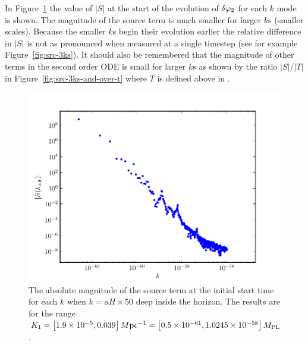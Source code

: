 In Figure~\ref{fig:src-kinit} the value of $|S|$ at the start of the evolution of $\delta\varphi_{2}$ for
each $k$ mode is shown. The magnitude of the source term is much smaller for larger $k$s (smaller
scales). 
Because the smaller $k$s begin their evolution earlier the relative difference in $|S|$ is not as
pronounced when measured at a single timestep (see for example Figure~\ref{fig:src-3ks}).
It should also be remembered that the magnitude of other terms in the second order ODE is
small for larger $k$s as shown by the ratio $|S|/|T|$ in Figure~\ref{fig:src-3ks-and-over-t}
where $T$ is defined above in .
\begin{figure}
\includegraphics[scale=0.8]{numerical/graphs/src_kinit_log}
 \caption{The absolute magnitude of the source term at the initial start time for each $k$ when
$k = aH \times 50$ deep inside the horizon. The results are for the range $K_1=\left[ 1.9\times 10^{-5},
0.039 \right] M \mathrm{pc}^{-1}= \left[0.5\times 10^{-61}, 1.0245\times 10^{-58}\right]M_{\mathrm{PL}}$.}
\label{fig:src-kinit}
\end{figure}
% 

